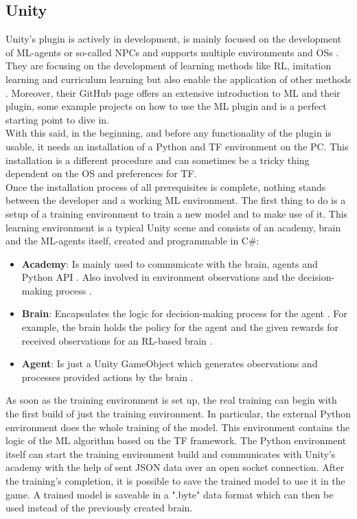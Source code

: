 \documentclass[MGS,Master,english]{twbook}%
\begin{document}
\subsection{Unity}
Unity's plugin is actively in development, is mainly focused on the development of ML-agents or so-called \ac{NPC}s and supports multiple environments and \acp{OS} \cite{unity::mlGithub}. They are focusing on the development of learning methods like RL, imitation learning and curriculum learning but also enable the application of other methods \cite{unity::mlGithub}. Moreover, their GitHub page offers an extensive introduction to ML and their plugin, some example projects on how to use the ML plugin and is a perfect starting point to dive in. \\
With this said, in the beginning, and before any functionality of the plugin is usable, it needs an installation of a Python and \ac{TF} environment on the PC. This installation is a different procedure and can sometimes be a tricky thing dependent on the \ac{OS} and preferences for \ac{TF}.\\
Once the installation process of all prerequisites is complete, nothing stands between the developer and a working ML environment. The first thing to do is a setup of a training environment to train a new model and to make use of it. This learning environment is a typical Unity scene and consists of an academy, brain and the ML-agents itself, created and programmable in C\#:
\begin{itemize}
	\item \textbf{Academy}: Is mainly used to communicate with the brain, agents and Python API \cite{unity::mlGithub}. Also involved in environment observations and the decision-making process \cite{unity::mlGithub}. 
	\item \textbf{Brain}: Encapsulates the logic for decision-making process for the agent \cite{unity::mlGithub}. For example, the brain holds the policy for the agent and the given rewards for received observations for an RL-based brain \cite{unity::mlGithub}.
	\item \textbf{Agent}: Is just a Unity GameObject which generates observations and processes provided actions by the brain \cite{unity::mlGithub}.
\end{itemize}  
As soon as the training environment is set up, the real training can begin with the first build of just the training environment. In particular, the external Python environment does the whole training of the model. This environment contains the logic of the ML algorithm based on the \ac{TF} framework. The Python environment itself can start the training environment build and communicates with Unity’s academy with the help of sent \ac{JSON} data over an open socket connection. After the training's completion, it is possible to save the trained model to use it in the game. A trained model is saveable in a ".byte" data format which can then be used instead of the previously created brain.
\end{document}
